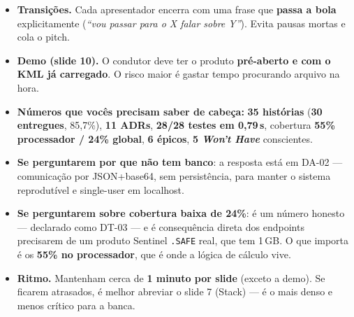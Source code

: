 \documentclass[12pt,a4paper]{article}
\begin{document}
\begin{itemize}
  \item \textbf{Transições.} Cada apresentador encerra com uma frase que
        \textbf{passa a bola} explicitamente (\textit{``vou passar para
        o X falar sobre Y''}). Evita pausas mortas e cola o pitch.
  \item \textbf{Demo (slide 10).} O condutor deve ter o produto
        \textbf{pré-aberto e com o KML já carregado}. O risco maior é
        gastar tempo procurando arquivo na hora.
  \item \textbf{Números que vocês precisam saber de cabeça:}
        \textbf{35 histórias} (\textbf{30 entregues}, 85{,}7\%),
        \textbf{11 ADRs}, \textbf{28/28 testes em 0{,}79\,s},
        cobertura \textbf{55\% processador / 24\% global},
        \textbf{6 épicos}, \textbf{5 \textit{Won't Have}} conscientes.
  \item \textbf{Se perguntarem por que não tem banco}: a resposta está
        em DA-02 — comunicação por JSON+base64, sem persistência, para
        manter o sistema reprodutível e single-user em localhost.
  \item \textbf{Se perguntarem sobre cobertura baixa de 24\%}: é um
        número honesto — declarado como DT-03 — e é consequência direta
        dos endpoints precisarem de um produto Sentinel \texttt{.SAFE}
        real, que tem 1\,GB. O que importa é os \textbf{55\% no
        processador}, que é onde a lógica de cálculo vive.
  \item \textbf{Ritmo.} Mantenham cerca de \textbf{1 minuto por slide}
        (exceto a demo). Se ficarem atrasados, é melhor abreviar o
        slide 7 (Stack) — é o mais denso e menos crítico para a banca.
\end{itemize}
\end{document}
